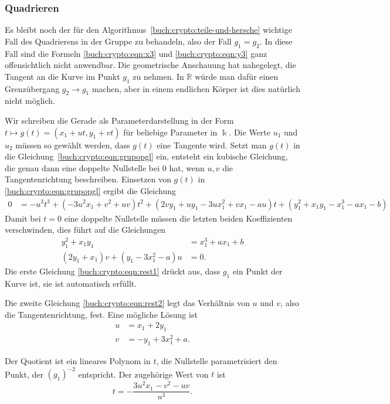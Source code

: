 \subsubsection{Quadrieren}
Es bleibt noch der für den Algorithmus~\ref{buch:crypto:teile-und-hersche}
wichtige Fall des Quadrierens in der Gruppe zu
behandeln, also der Fall $g_1=g_2$.
In diese Fall sind die Formeln
\eqref{buch:crypto:eqn:x3}
und
\eqref{buch:crypto:eqn:y3}
ganz offensichtlich nicht anwendbar.
Die geometrische Anschauung hat nahegelegt, die Tangent an die Kurve
im Punkt $g_1$ zu nehmen.
In $\mathbb{R}$ würde man dafür einen Grenzübergang $g_2\to g_1$ machen,
aber in einem endlichen Körper ist dies natürlich nicht möglich.

Wir schreiben die Gerade als Parameterdarstellung in der Form
\(
t\mapsto g(t)= (x_1+ut, y_1+vt)
\)
für beliebige Parameter in $\Bbbk$.
Die Werte $u_1$ und $u_2$ müssen so gewählt werden, dass $g(t)$ eine
Tangente wird.
Setzt man $g(t)$ in die Gleichung~\eqref{buch:crypto:eqn:grupopgl} ein,
entsteht ein kubische Gleichung, die genau dann eine doppelte Nullstelle
bei $0$ hat, wenn $u,v$ die Tangentenrichtung beschreiben.
Einsetzen von $g(t)$ in \eqref{buch:crypto:eqn:grupopgl}
ergibt die Gleichung
\begin{align}
0
&=
-u^3t^3
+
(-3u^2x_{1}+v^2+uv)t^2
+
(2vy_1+uy_1-3ux_1^2+vx_1-au)t
+
(y_1^2+x_1y_1-x_1^3-ax_1-b)
\label{buch:crypto:eqn:tangente1}
\end{align}
Damit bei $t=0$ eine doppelte Nullstelle müssen die letzten beiden
Koeffizienten verschwinden, dies führt auf die Gleichungen
\begin{align}
y_1^2+x_1y_1&=x_1^3+ax_1+b
\label{buch:crypto:eqn:rest1}
\\
(2y_1
+x_1)v
+(y_1
-3x_1^2
-a)u
&=0.
\label{buch:crypto:eqn:rest2}
\end{align}
Die erste Gleichung \eqref{buch:crypto:eqn:rest1} drückt aus,
dass $g_1$ ein Punkt der Kurve ist, sie ist automatisch erfüllt.

Die zweite Gleichung
\eqref{buch:crypto:eqn:rest2}
legt das Verhältnis von $u$ und $v$, also die
Tangentenrichtung, fest.
Eine mögliche Lösung ist
\begin{equation}
\begin{aligned}
u &= x_1+2y_1
\\
v &= -y_1+3x_1^2+a.
\end{aligned}
\label{buch:crypto:eqn:uv}
\end{equation}

Der Quotient ist ein lineares Polynom in $t$, die Nullstelle parametrisiert
den Punkt, der $(g_1)^{-2}$ entspricht.
Der zugehörige Wert von $t$ ist
\begin{equation}
t=-\frac{3u^2x_1-v^2-uv}{u^3}.
\label{buch:crypto:eqn:t}
\end{equation}


